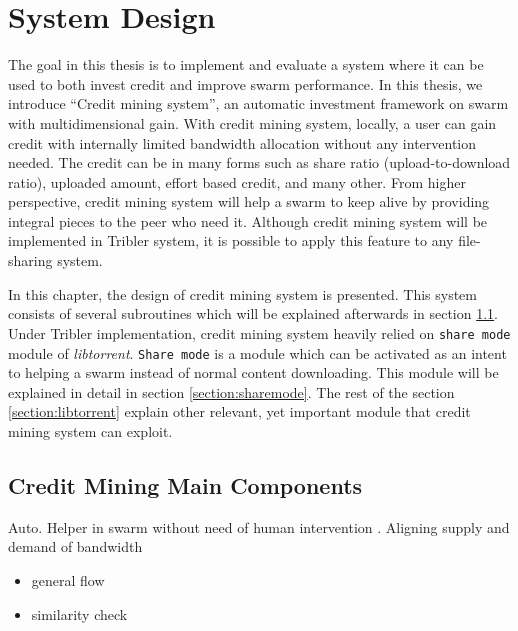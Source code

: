 \chapter{System Design}
\label{chp:design}

The goal in this thesis is to implement and evaluate a system where it can be used to both invest credit and improve swarm performance. In this thesis, we introduce ``Credit mining system'', an automatic investment framework on swarm with multidimensional gain. With credit mining system, locally, a user can gain credit with internally limited bandwidth allocation without any intervention needed. The credit can be in many forms such as share ratio (upload-to-download ratio), uploaded amount, effort based credit, and many other. From higher perspective, credit mining system will help a swarm to keep alive by providing integral pieces to the peer who need it. Although credit mining system will be implemented in Tribler system, it is possible to apply this feature to any file-sharing system.

In this chapter, the design of credit mining system is presented. This system consists of several subroutines which will be explained afterwards in section \ref{section:cmcomponents}. Under Tribler implementation, credit mining system heavily relied on \texttt{share mode} module of \textit{libtorrent}. \texttt{Share mode} is a module which can be activated as an intent to helping a swarm instead of normal content downloading. This module will be explained in detail in section \ref{section:sharemode}. The rest of the section \ref{section:libtorrent} explain other relevant, yet important module that credit mining system can exploit.

\section{Credit Mining Main Components}
\label{section:cmcomponents}

Auto. Helper in swarm without need of human intervention \cite{2014:bwmarket:capota}. Aligning supply and demand of bandwidth

\begin{itemize}
\item general flow
\item similarity check
\end{itemize}


